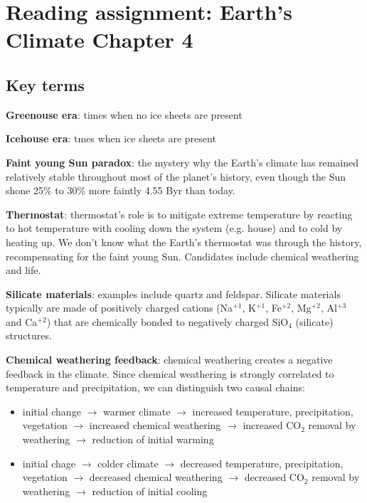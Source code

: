 \section{Reading assignment: Earth's Climate Chapter 4}

\subsection{Key terms}

\textbf{Greenouse era}: times when no ice sheets are present 

\textbf{Icehouse era}: tmes when ice sheets are present

\textbf{Faint young Sun paradox}: the mystery why the Earth's climate has
remained relatively stable throughout most of the planet's history, even
though the Sun shone 25\% to 30\% more faintly 4.55 Byr than today.

\textbf{Thermostat}: thermostat's role is to mitigate extreme temperature by
reacting to hot temperature with cooling down the system (e.g. house) and to
cold by heating up. We don't know what the Earth's thermostat was through the
history, recompensating for the faint young Sun. Candidates include chemical
weathering and life.

\textbf{Silicate materials}: examples include quartz and feldspar. Silicate
materials typically are made of positively charged cations (Na$^{+1}$,
K$^{+1}$, Fe$^{+2}$, Mg$^{+2}$, Al$^{+3}$ and Ca$^{+2}$) that are chemically
bonded to negatively charged SiO$_4$ (silicate) structures.

\textbf{Chemical weathering feedback}: chemical weathering creates a negative
feedback in the climate. Since chemical weathering is strongly correlated to
temperature and precipitation, we can distinguish two causal chains:

\begin{itemize}
  \item initial change $\rightarrow$ warmer climate $\rightarrow$
    increased temperature, precipitation, vegetation $\rightarrow$ increased
    chemical weathering $\rightarrow$ increased CO$_2$ removal by weathering
    $\rightarrow$ reduction of initial warming
  \item initial chage $\rightarrow$ colder climate $\rightarrow$ decreased
    temperature, precipitation, vegetation $\rightarrow$ decreased chemical
    weathering $\rightarrow$ decreased CO$_2$ removal by weathering
    $\rightarrow$ reduction of initial cooling 
\end{itemize}

